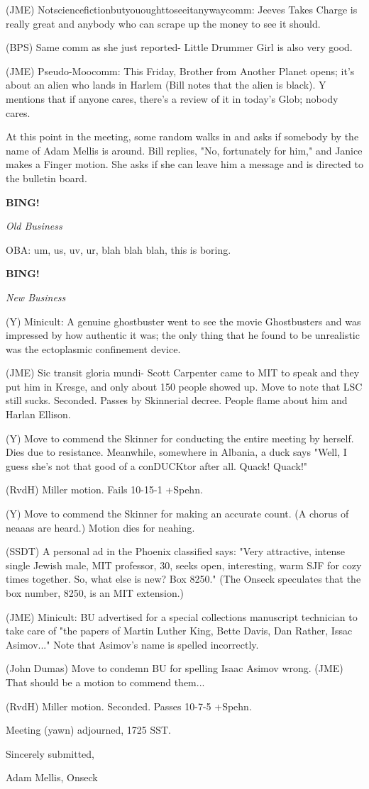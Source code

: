 \documentclass[12pt]{article}
\newcommand{\bing}{{\bf BING!} }
\newcommand{\goto}[1]{\bing \vskip 12pt \centerline{{\em{#1}}}}
\begin{document}
(JME) Notsciencefictionbutyououghttoseeitanywaycomm: Jeeves Takes Charge is really great and anybody who can scrape up the money to see it should.

(BPS) Same comm as she just reported- Little Drummer Girl is also very good.

(JME) Pseudo-Moocomm: This Friday, Brother from Another Planet opens; it's about an alien who lands in Harlem (Bill notes that the alien is black). Y mentions that if anyone cares, there's a review of it in today's Glob; nobody cares.

At this point in the meeting, some random walks in and asks if somebody by the name of Adam Mellis is around. Bill replies, "No, fortunately for him," and Janice makes a Finger motion. She asks if she can leave him a message and is directed to the bulletin board.

\goto{Old Business}

OBA: um, us, uv, ur, blah blah blah, this is boring.

\goto{New Business}

(Y) Minicult: A genuine ghostbuster went to see the movie Ghostbusters and was impressed by how authentic it was; the only thing that he found to be unrealistic was the ectoplasmic confinement device.

(JME) Sic transit gloria mundi- Scott Carpenter came to MIT to speak and they put him in Kresge, and only about 150 people showed up. Move to note that LSC still sucks. Seconded. Passes by Skinnerial decree. People flame about him and Harlan Ellison.

(Y) Move to commend the Skinner for conducting the entire meeting by herself. Dies due to resistance. Meanwhile, somewhere in Albania, a duck says "Well, I guess she's not that good of a conDUCKtor after all. Quack! Quack!"

(RvdH) Miller motion. Fails 10-15-1 +Spehn.

(Y) Move to commend the Skinner for making an accurate count. (A chorus of neaaas are heard.) Motion dies for neahing.

(SSDT) A personal ad in the Phoenix classified says: "Very attractive, intense single Jewish male, MIT professor, 30, seeks open, interesting, warm SJF for cozy times together. So, what else is new? Box 8250." (The Onseck speculates that the box number, 8250, is an MIT extension.)

(JME) Minicult: BU advertised for a special collections manuscript technician to take care of "the papers of Martin Luther King, Bette Davis, Dan Rather, Issac Asimov..." Note that Asimov's name is spelled incorrectly.

(John Dumas) Move to condemn BU for spelling Isaac Asimov wrong. (JME) That should be a motion to commend them...

(RvdH) Miller motion. Seconded. Passes 10-7-5 +Spehn.

\vspace{12pt}

\noindent
Meeting (yawn) adjourned, 1725 SST.

\vspace{18pt}

\centerline{Sincerely submitted,}
\centerline{Adam Mellis, Onseck}
\end{document}
